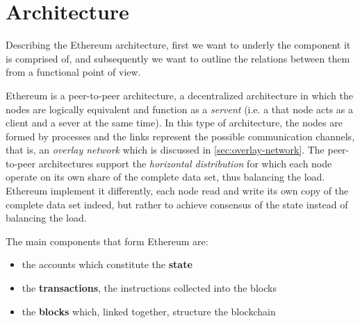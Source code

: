 \section{Architecture}

Describing the Ethereum architecture, first we want to underly the component it
is comprised of, and subsequently we want to outline the relations between them
from a functional point of view.

Ethereum is a peer-to-peer architecture, a decentralized architecture in which
the nodes are logically equivalent and function as a \emph{servent} (i.e. a that
node acts as a client and a sever at the same time). In this type of
architecture, the nodes are formed by processes and the links represent the
possible communication channels, that is, an \emph{overlay network}
\cite{van2017distributed} which is discussed in \autoref{sec:overlay-network}.
The peer-to-peer architectures support the \emph{horizontal distribution} for
which each node operate on its own share of the complete data set, thus
balancing the load. Ethereum implement it differently, each node read and write
its own copy of the complete data set indeed, but rather to achieve consensus of
the state instead of balancing the load.

The main components that form Ethereum are:

\begin{itemize}
  \item the accounts which constitute the \textbf{state}
  \item the \textbf{transactions}, the instructions collected into the blocks
  \item the \textbf{blocks} which, linked together, structure the blockchain
\end{itemize}


